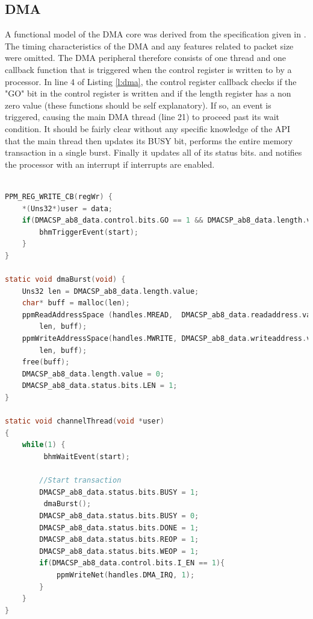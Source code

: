\subsection{DMA}
A functional model of the DMA core was derived from the specification given in \cite{altera_ip_ug}. The timing characteristics of the DMA and any features related to packet size were omitted. The DMA peripheral therefore consists of one thread and one callback function that is triggered when the control register is written to by a processor. In line 4 of Listing \ref{l:dma}, the control register callback checks if the "GO" bit in the control register is written and if the length register has a non zero value (these functions should be self explanatory). If so, an event is triggered, causing the main DMA thread (line 21) to proceed past its wait condition. It should be fairly clear without any specific knowledge of the API that the main thread then updates its BUSY bit, performs the entire memory transaction in a single burst. Finally it updates all of its status bits. and notifies the processor with an interrupt if interrupts are enabled.

\begin{lstlisting}[frame=single,language=C,label=l:dma,caption=DMA model.]

PPM_REG_WRITE_CB(regWr) {
    *(Uns32*)user = data;
    if(DMACSP_ab8_data.control.bits.GO == 1 && DMACSP_ab8_data.length.value > 0){
        bhmTriggerEvent(start);
    }
}

static void dmaBurst(void) {   
    Uns32 len = DMACSP_ab8_data.length.value;
    char* buff = malloc(len);
    ppmReadAddressSpace (handles.MREAD,  DMACSP_ab8_data.readaddress.value, 
        len, buff);
    ppmWriteAddressSpace(handles.MWRITE, DMACSP_ab8_data.writeaddress.value, 
        len, buff);
    free(buff);
    DMACSP_ab8_data.length.value = 0;
    DMACSP_ab8_data.status.bits.LEN = 1;
}

static void channelThread(void *user)
{
    while(1) {
         bhmWaitEvent(start);
        
        //Start transaction
        DMACSP_ab8_data.status.bits.BUSY = 1;
         dmaBurst();
        DMACSP_ab8_data.status.bits.BUSY = 0;
        DMACSP_ab8_data.status.bits.DONE = 1;
        DMACSP_ab8_data.status.bits.REOP = 1;
        DMACSP_ab8_data.status.bits.WEOP = 1;
        if(DMACSP_ab8_data.control.bits.I_EN == 1){
            ppmWriteNet(handles.DMA_IRQ, 1);   
        }
    }
}
\end{lstlisting}

